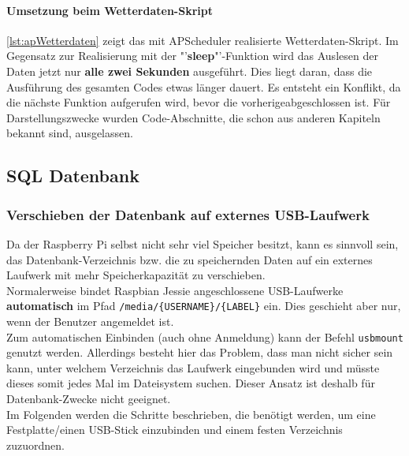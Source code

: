 


\paragraph{Umsetzung beim Wetterdaten-Skript}

\autoref{lst:apWetterdaten} zeigt das mit APScheduler realisierte Wetterdaten-Skript. Im Gegensatz zur Realisierung mit der "'\textbf{sleep}"'-Funktion wird das Auslesen der Daten jetzt nur \textbf{alle zwei Sekunden} ausgeführt. Dies liegt daran, dass die Ausführung des gesamten Codes etwas länger dauert. Es entsteht ein Konflikt, da die nächste Funktion aufgerufen wird, bevor die vorherigeabgeschlossen ist. Für Darstellungszwecke wurden Code-Abschnitte, die schon aus anderen Kapiteln bekannt sind, ausgelassen.



\newpage

\subsection{SQL Datenbank}

\subsubsection{Verschieben der Datenbank auf externes USB-Laufwerk}
Da der Raspberry Pi selbst nicht sehr viel Speicher besitzt, kann es sinnvoll sein, das Datenbank-Verzeichnis bzw. die zu speichernden Daten auf ein externes Laufwerk mit mehr Speicherkapazität zu verschieben.\\
Normalerweise bindet Raspbian Jessie angeschlossene USB-Laufwerke \textbf{automatisch} im Pfad \texttt{/media/\{USERNAME\}/\{LABEL\}} ein. Dies geschieht aber nur, wenn der Benutzer angemeldet ist.\\
Zum automatischen Einbinden (auch ohne Anmeldung) kann der Befehl \texttt{usbmount} genutzt werden. Allerdings besteht hier das Problem, dass man nicht sicher sein kann, unter welchem Verzeichnis das Laufwerk eingebunden wird und müsste dieses somit jedes Mal im Dateisystem suchen. Dieser Ansatz ist deshalb für Datenbank-Zwecke nicht geeignet.\\
Im Folgenden werden die Schritte beschrieben, die benötigt werden, um eine Festplatte/einen USB-Stick einzubinden und einem festen Verzeichnis zuzuordnen.

